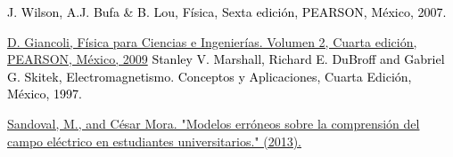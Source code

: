 \documentclass[a4paper,10pt]{article}
\begin{document}
\begin{multicols}{2}
\begin{thebibliography}{0}
\textcolor{Black}{J. Wilson, A.J. Bufa \& B. Lou, Física, Sexta edición, PEARSON, México, 2007.} \par
{}\textcolor{MiColor2}{\protect\href{http://esystems.mx/BPC/llyfrgell/0296.pdf}{D. Giancoli, Física para Ciencias e Ingenierías. Volumen 2, Cuarta edición, PEARSON, México, 2009}}
\textcolor{Black}{Stanley V. Marshall, Richard E. DuBroff and Gabriel G. Skitek, Electromagnetismo. Conceptos y Aplicaciones, Cuarta Edición, México, 1997.} \par
{}\textcolor{MiColor2}{\protect\href{https://repositoriodigital.ipn.mx/bitstream/123456789/10744/1/25_LAJPE_285_Manuel_Sandoval.pdf}{Sandoval, M., and César Mora. "Modelos erróneos sobre la comprensión del campo eléctrico en estudiantes universitarios." (2013).}}

\end{thebibliography}

\end{multicols}
\end{document}
